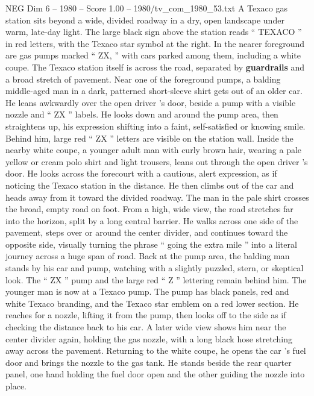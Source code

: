 \begin{textsample}{NEG Dim 6 – 1980 – Score 1.00 – 1980/tv\_com\_1980\_53.txt}  \label{ex:f6_neg_070}
A Texaco gas station sits beyond a wide, divided roadway in a dry, open landscape under warm, late-day light.
The large black sign above the station reads “ TEXACO ” in red letters, with the Texaco star symbol at the right.
In the nearer foreground are gas pumps marked “ ZX, ” with cars parked among them, including a white coupe.
The Texaco station itself is across the road, separated by \textbf{guardrails} and a broad stretch of pavement.
Near one of the foreground pumps, a balding middle-aged man in a dark, patterned short-sleeve shirt gets out of an older car.
He leans awkwardly over the open driver ’s door, beside a pump with a visible nozzle and “ ZX ” labels.
He looks down and around the pump area, then straightens up, his expression shifting into a faint, self-satisfied or knowing smile.
Behind him, large red “ ZX ” letters are visible on the station wall.
Inside the nearby white coupe, a younger adult man with curly brown hair, wearing a pale yellow or cream polo shirt and light trousers, leans out through the open driver ’s door.
He looks across the forecourt with a cautious, alert expression, as if noticing the Texaco station in the distance.
He then climbs out of the car and heads away from it toward the divided roadway.
The man in the pale shirt crosses the broad, empty road on foot.
From a high, wide view, the road stretches far into the horizon, split by a long central barrier.
He walks across one side of the pavement, steps over or around the center divider, and continues toward the opposite side, visually turning the phrase “ going the extra mile ” into a literal journey across a huge span of road.
Back at the pump area, the balding man stands by his car and pump, watching with a slightly puzzled, stern, or skeptical look.
The “ ZX ” pump and the large red “ Z ” lettering remain behind him.
The younger man is now at a Texaco pump.
The pump has black panels, red and white Texaco branding, and the Texaco star emblem on a red lower section.
He reaches for a nozzle, lifting it from the pump, then looks off to the side as if checking the distance back to his car.
A later wide view shows him near the center divider again, holding the gas nozzle, with a long black hose stretching away across the pavement.
Returning to the white coupe, he opens the car ’s fuel door and brings the nozzle to the gas tank.
He stands beside the rear quarter panel, one hand holding the fuel door open and the other guiding the nozzle into place.

\end{textsample}

